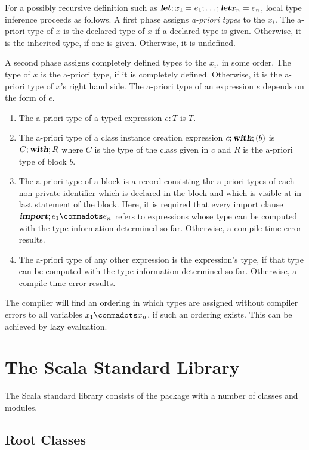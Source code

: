 \documentclass[11pt]{report}
\begin{document}
\begin{itemize}
{For a possibly recursive definition such as $\mbox{\sl\bfseries let};x_1 = e_1
;\ldots; \mbox{\sl\bfseries let} x_n = e_n$, local type inference proceeds as
follows.
A first phase assigns {\em a-priori types} to the $x_i$. The a-priori
type of $x$ is the declared type of $x$ if a declared type is
given. Otherwise, it is the inherited type, if one is
given. Otherwise, it is undefined.

A second phase assigns completely defined types to the $x_i$, in some
order.  The type of $x$ is the a-priori type, if it is completely
defined. Otherwise, it is the a-priori type of $x$'s right hand side.
The a-priori type of an expression $e$ depends on the form of $e$.
\begin{enumerate}
\item
The a-priori type of a
typed expression $e:T$ is $T$.
\item
The a-priori type of a class instance
creation expression $c;\mbox{\sl\bfseries with};(b)$ is $C;\mbox{\sl\bfseries with};R$ where $C$ is the
type of the class given in $c$ and $R$ is the a-priori type of block
$b$.
\item
The a-priori type of a block is a record consisting the a-priori
types of each non-private identifier which is declared in the block
and which is visible at in last statement of the block.  Here, it is
required that every import clause $\IMPORT;e_1 \commadots e_n$ refers
to expressions whose type can be computed with the type information
determined so far. Otherwise, a compile time error results.
\item
The a-priori type of any other expression is the expression's type, if
that type can be computed with the type information determined so far.
Otherwise, a compile time error results.
\end{enumerate}
The compiler will find an ordering in which types are assigned without
compiler errors to all variables $x_1 \commadots x_n$, if such an
ordering exists. This can be achieved by lazy evaluation.
}

\chapter{The Scala Standard Library}

The Scala standard library consists of the package \verb@scala@ with a
number of classes and modules.

\section{Root Classes}
\label{sec:cls-root}
\label{sec:cls-any}
\label{sec:cls-object}


\end{itemize}
\end{document}
